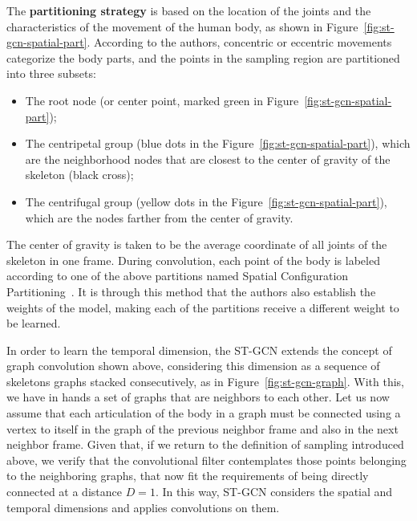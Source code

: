 The \textbf{partitioning strategy} is based on the location of the joints and the characteristics of the movement of the human body, as shown in Figure~\ref{fig:st-gcn-spatial-part}. According to the authors, concentric or eccentric movements categorize the body parts, and the points in the sampling region are partitioned into three subsets: %
    
\begin{itemize}
    \item The root node (or center point, marked green in Figure~\ref{fig:st-gcn-spatial-part});
    \item The centripetal group (blue dots in the Figure~\ref{fig:st-gcn-spatial-part}), which are the neighborhood nodes that are closest to the center of gravity of the skeleton (black cross);
    \item The centrifugal group (yellow dots in the Figure~\ref{fig:st-gcn-spatial-part}), which are the nodes farther from the center of gravity.
\end{itemize}

The center of gravity is taken to be the average coordinate of all joints of the skeleton in one frame. During convolution, each point of the body is labeled according to one of the above partitions named Spatial Configuration Partitioning~\cite{st-gcn-2018}. It is through this method that the authors also establish the weights of the model, making each of the partitions receive a different weight to be learned.

    
In order to learn the temporal dimension, the ST-GCN extends the concept of graph convolution shown above, considering this dimension as a sequence of skeletons graphs stacked consecutively, as in Figure~\ref{fig:st-gcn-graph}. With this, we have in hands a set of graphs that are neighbors to each other. Let us now assume that each articulation of the body in a graph must be connected using a vertex to itself in the graph of the previous neighbor frame and also in the next neighbor frame. Given that, if we return to the definition of sampling introduced above, we verify that the convolutional filter contemplates those points belonging to the neighboring graphs, that now fit the requirements of being directly connected at a distance $D = 1$. In this way, ST-GCN considers the spatial and temporal dimensions and applies convolutions on them.

